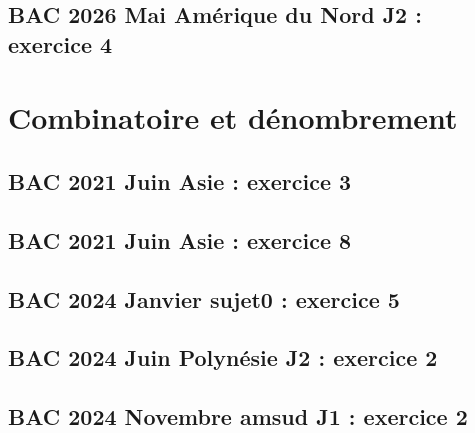 \documentclass[lang=fr,edition=teacher,layout=sheet]{mxbook}
\begin{document}
\begingroup\endgroup
\par\bigskip
{}\subsection*{BAC 2026 Mai Amérique du Nord J2 : exercice 4}
\begingroup\endgroup
\par\bigskip
\clearpage\section*{Combinatoire et dénombrement}
\subsection*{BAC 2021 Juin Asie : exercice 3}
\begingroup\endgroup
\par\bigskip
{}\subsection*{BAC 2021 Juin Asie : exercice 8}
\begingroup\endgroup
\par\bigskip
{}\subsection*{BAC 2024 Janvier sujet0 : exercice 5}
\begingroup\endgroup
\par\bigskip
{}\subsection*{BAC 2024 Juin Polynésie J2 : exercice 2}
\begingroup\endgroup
\par\bigskip
{}\subsection*{BAC 2024 Novembre amsud J1 : exercice 2}
\begingroup\endgroup
\end{document}
